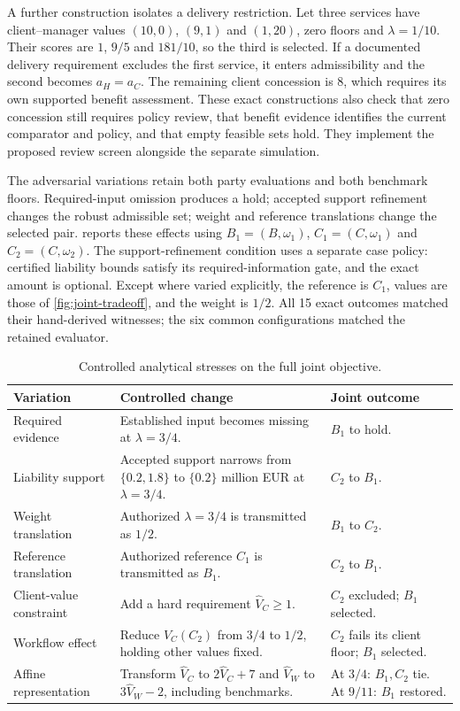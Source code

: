 \documentclass[oneside,10pt,english]{swissi}
\begin{document}
A further construction isolates a delivery restriction. Let three services have client--manager values $(10,0)$, $(9,1)$ and $(1,20)$, zero floors and $\lambda=1/10$. Their scores are $1$, $9/5$ and $181/10$, so the third is selected. If a documented delivery requirement excludes the first service, it enters admissibility and the second becomes $a_H=a_C$. The remaining client concession is 8, which requires its own supported benefit assessment. These exact constructions also check that zero concession still requires policy review, that benefit evidence identifies the current comparator and policy, and that empty feasible sets hold. They implement the proposed review screen alongside the separate simulation.

The adversarial variations retain both party evaluations and both benchmark floors. Required-input omission produces a hold; accepted support refinement changes the robust admissible set; weight and reference translations change the selected pair.  reports these effects using $B_1=(B,\omega_1)$, $C_1=(C,\omega_1)$ and $C_2=(C,\omega_2)$. The support-refinement condition uses a separate case policy: certified liability bounds satisfy its required-information gate, and the exact amount is optional. Except where varied explicitly, the reference is $C_1$, values are those of \cref{fig:joint-tradeoff}, and the weight is $1/2$. All 15 exact outcomes matched their hand-derived witnesses; the six common configurations matched the retained evaluator.

\begin{table}[htbp]
\centering
\caption{Controlled analytical stresses on the full joint objective.}
\label{tab:joint-stress}
\small
\begin{tabularx}{\textwidth}{@{}>{\raggedright\arraybackslash}p{}>{\raggedright\arraybackslash}X>{\raggedright\arraybackslash}p{}@{}}
\toprule
Variation & Controlled change & Joint outcome \\
\midrule
Required evidence & Established input becomes missing at $\lambda=3/4$. & $B_1$ to hold. \\
Liability support & Accepted support narrows from $\{0.2,1.8\}$ to $\{0.2\}$ million EUR at $\lambda=3/4$. & $C_2$ to $B_1$. \\
Weight translation & Authorized $\lambda=3/4$ is transmitted as $1/2$. & $B_1$ to $C_2$. \\
Reference translation & Authorized reference $C_1$ is transmitted as $B_1$. & $C_2$ to $B_1$. \\
Client-value constraint & Add a hard requirement $\widehat V_C\ge1$. & $C_2$ excluded; $B_1$ selected. \\
Workflow effect & Reduce $\widehat V_C(C_2)$ from $3/4$ to $1/2$, holding other values fixed. & $C_2$ fails its client floor; $B_1$ selected. \\
Affine representation & Transform $\widehat V_C$ to $2\widehat V_C+7$ and $\widehat V_W$ to $3\widehat V_W-2$, including benchmarks. & At $3/4$: $B_1,C_2$ tie. At $9/11$: $B_1$ restored. \\
\bottomrule
\end{tabularx}
\end{table}
\end{document}
